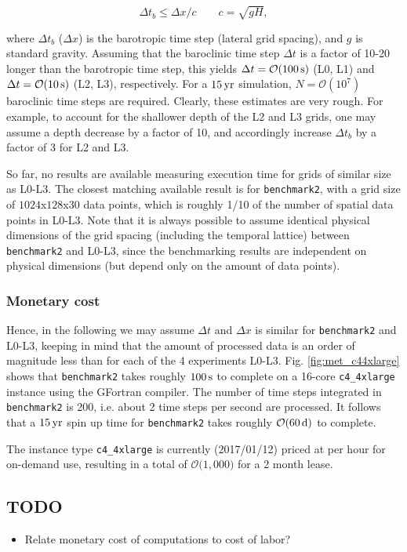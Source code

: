 \documentclass[12pt,a4paper]{article}
\begin{document}
\begin{equation}
\Delta t_{b}\leq\Delta x/c \qquad c=\sqrt{gH},
\end{equation}

where $\Delta t_b$ ($\Delta x$) is the barotropic time step (lateral grid spacing), and $g$ is standard gravity. Assuming that the baroclinic time step $\Delta t$ is a factor of 10-20 longer than the barotropic time step, this yields $\Delta t=\mathcal{O}(100\,\rm s)$ (L0, L1) and $\Delta t= \mathcal{O}(10\,\rm s)$ (L2, L3), respectively. For a $15\,\rm yr$ simulation, $N=\mathcal{O}(10^7)$ baroclinic time steps are required. Clearly, these estimates are very rough. For example, to account for the shallower depth of the L2 and L3 grids,  one may assume a depth decrease by a factor of 10, and accordingly increase $\Delta t_b$ by a factor of 3 for L2 and L3. 

So far, no results are available measuring execution time for grids of similar size as L0-L3. The closest matching available result is for \verb|benchmark2|, with a grid size of $1024$x$128$x$30$ data points, which is roughly 1/10 of the number of spatial data points in L0-L3. Note that it is always possible to assume identical physical dimensions of the grid spacing (including the temporal lattice) between \verb|benchmark2| and L0-L3, since the benchmarking results are independent on physical dimensions (but depend only on the amount of data points).


\subsubsection{Monetary cost}

Hence, in the following we may assume $\Delta t$ and $\Delta x$ is similar for \verb|benchmark2| and L0-L3, keeping in mind that the amount of processed data is an order of magnitude less than for each of the 4 experiments L0-L3.
Fig. \ref{fig:met_c44xlarge} shows that \verb|benchmark2| takes roughly $100\,\rm s$ to complete on a 16-core \verb|c4_4xlarge| instance using the GFortran compiler. The number of time steps integrated in  \verb|benchmark2| is 200, i.e. about 2 time steps per second are processed. It follows that a $15\,\rm yr$ spin up time for \verb|benchmark2| takes roughly $\mathcal{O}(60\,\rm d)$ to complete.

The instance type \verb|c4_4xlarge| is currently (2017/01/12) priced at  per hour for on-demand use, resulting in a total of $\mathcal{O}($\textdollar $1,000) $ for a 2 month lease.


\subsection{TODO}

\begin{itemize}
	\item Relate monetary cost of computations to cost of labor?
\end{itemize}

	


\end{document}
